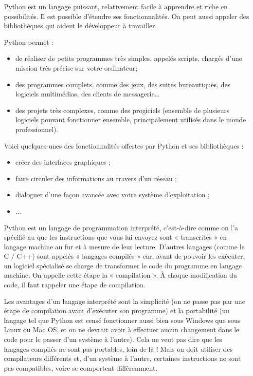 Python est un langage puissant, relativement facile à apprendre et riche en possibilités. Il est possible d'étendre ses fonctionnalités. On peut aussi appeler des bibliothèques qui aident le développeur à travailler. 

Python permet :
\begin{itemize}
\item de réaliser de petits programmes très simples, appelés scripts, chargés d'une mission très précise sur votre ordinateur;
\item des programmes complets, comme des jeux, des suites bureautiques, des logiciels multimédias, des clients de messagerie…
\item des projets très complexes, comme des progiciels (ensemble de plusieurs logiciels pouvant fonctionner ensemble, principalement utilisés dans le monde professionnel).
\end{itemize}

Voici quelques-unes des fonctionnalités offertes par Python et ses bibliothèques :
\begin{itemize}
\item créer des interfaces graphiques ;
\item faire circuler des informations au travers d'un réseau ;
\item dialoguer d'une façon avancée avec votre système d'exploitation ;
\item ...
\end{itemize}


Python est un langage de programmation interprété, c'est-à-dire comme on l'a spécifié au que les instructions que vous lui envoyez sont « transcrites » en langage machine au fur et à mesure de leur lecture. D'autres langages (comme le C / C++) sont appelés « langages compilés » car, avant de pouvoir les exécuter, un logiciel spécialisé se charge de transformer le code du programme en langage machine. On appelle cette étape la « compilation ». À chaque modification du code, il faut rappeler une étape de compilation.

Les avantages d'un langage interprété sont la simplicité (on ne passe pas par une étape de compilation avant d'exécuter son programme) et la portabilité (un langage tel que Python est censé fonctionner aussi bien sous Windows que sous Linux ou Mac OS, et on ne devrait avoir à effectuer aucun changement dans le code pour le passer d'un système à l'autre). Cela ne veut pas dire que les langages compilés ne sont pas portables, loin de là ! Mais on doit utiliser des compilateurs différents et, d'un système à l'autre, certaines instructions ne sont pas compatibles, voire se comportent différemment.

